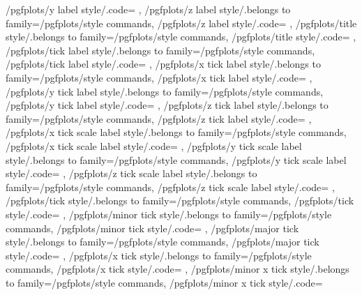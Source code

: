 {	/pgfplots/y label style/.code={%
	},
	/pgfplots/z label style/.belongs to family=/pgfplots/style commands,
	/pgfplots/z label style/.code={%
	},
	/pgfplots/title style/.belongs to family=/pgfplots/style commands,
	/pgfplots/title style/.code={%
	},
	/pgfplots/tick label style/.belongs to family=/pgfplots/style commands,
	/pgfplots/tick label style/.code={%
	},
	/pgfplots/x tick label style/.belongs to family=/pgfplots/style commands,
	/pgfplots/x tick label style/.code={%
	},
	/pgfplots/y tick label style/.belongs to family=/pgfplots/style commands,
	/pgfplots/y tick label style/.code={%
	},
	/pgfplots/z tick label style/.belongs to family=/pgfplots/style commands,
	/pgfplots/z tick label style/.code={%
	},
	/pgfplots/x tick scale label style/.belongs to family=/pgfplots/style commands,
	/pgfplots/x tick scale label style/.code={%
	},
	/pgfplots/y tick scale label style/.belongs to family=/pgfplots/style commands,
	/pgfplots/y tick scale label style/.code={%
	},
	/pgfplots/z tick scale label style/.belongs to family=/pgfplots/style commands,
	/pgfplots/z tick scale label style/.code={%
	},
	/pgfplots/tick style/.belongs to family=/pgfplots/style commands,
	/pgfplots/tick style/.code={%
	},
	/pgfplots/minor tick style/.belongs to family=/pgfplots/style commands,
	/pgfplots/minor tick style/.code={%
	},
	/pgfplots/major tick style/.belongs to family=/pgfplots/style commands,
	/pgfplots/major tick style/.code={%
	},
	/pgfplots/x tick style/.belongs to family=/pgfplots/style commands,
	/pgfplots/x tick style/.code={%
	},
	/pgfplots/minor x tick style/.belongs to family=/pgfplots/style commands,
	/pgfplots/minor x tick style/.code={%
}}
